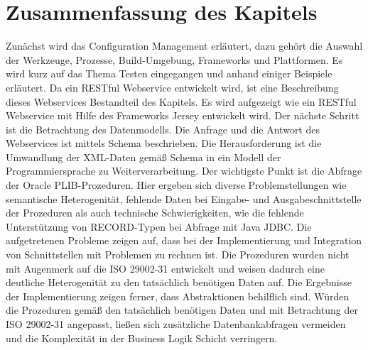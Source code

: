 \section{Zusammenfassung des Kapitels}

Zunächst wird das Configuration Management erläutert, dazu gehört die Auswahl der Werkzeuge, Prozesse, Build-Umgebung, Frameworks und Plattformen. Es wird kurz auf das Thema Testen eingegangen und anhand einiger Beispiele erläutert. Da ein \gls{REST}ful Webservice entwickelt wird, ist eine Beschreibung dieses Webservices Bestandteil des Kapitels. Es wird aufgezeigt wie ein RESTful Webservice mit Hilfe des Frameworks Jersey entwickelt wird. 
Der nächste Schritt ist die Betrachtung des Datenmodells. Die Anfrage und die Antwort des Webservices ist mittels Schema beschrieben. Die Herausforderung ist die Umwandlung der XML-Daten gemäß Schema in ein Modell der Programmiersprache zu Weiterverarbeitung.  
Der wichtigste Punkt ist die Abfrage der Oracle PLIB-Prozeduren. Hier ergeben sich diverse Problemstellungen wie semantische Heterogenität, fehlende Daten bei Eingabe- und Ausgabeschnittstelle der Prozeduren als auch technische Schwierigkeiten, wie die fehlende Unterstützung von RECORD-Typen bei Abfrage mit Java JDBC.
Die aufgetretenen Probleme zeigen auf, dass bei der Implementierung und Integration von Schnittstellen mit Problemen zu rechnen ist. Die Prozeduren wurden nicht mit Augenmerk auf die ISO 29002-31 entwickelt und weisen dadurch eine deutliche Heterogenität zu den tatsächlich benötigen Daten auf. Die Ergebnisse der Implementierung zeigen ferner, dass Abstraktionen behilflich sind. Würden die Prozeduren gemäß den tatsächlich benötigen Daten und mit Betrachtung der ISO 29002-31 angepasst, ließen sich zusätzliche Datenbankabfragen vermeiden und die Komplexität in der Business Logik Schicht verringern. 

